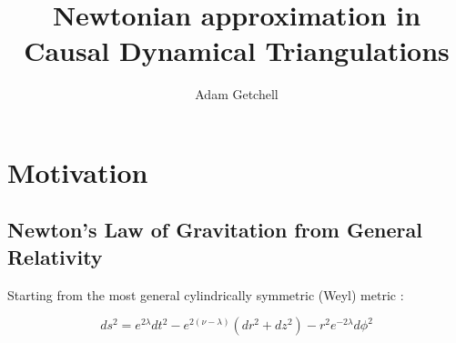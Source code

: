 \documentclass{article}
\title{Newtonian approximation in Causal Dynamical Triangulations}
\author{Adam Getchell}
\date{}
\begin{document}
\maketitle
\tableofcontents

\section{Motivation}

\subsection{Newton's Law of Gravitation from General Relativity}

Starting from the most general cylindrically symmetric (Weyl) metric \cite{synge_relativity}:

\begin{equation}
ds^{2}=e^{2\lambda}dt^{2}-e^{2\left(\nu-\lambda\right)}\left(dr^{2}+dz^{2}\right)-r^{2}e^{-2\lambda}d\phi^{2}
\end{equation}
\end{document}
